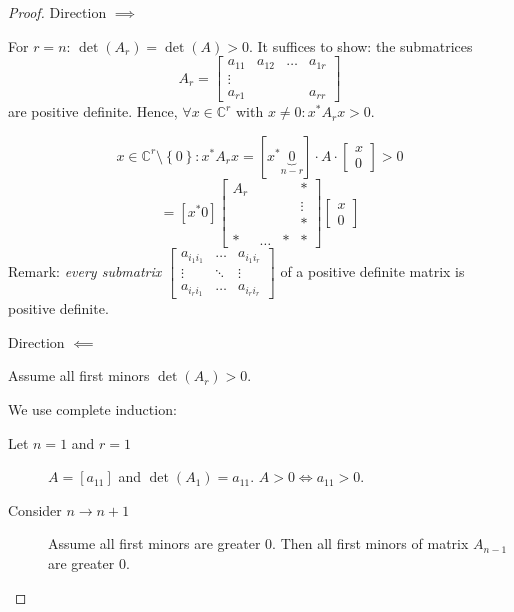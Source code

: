 \documentclass{article}
\newcommand{\set}[1]{\left\{#1\right\}}
\begin{document}
\begin{proof}
  Direction $\implies$

  For $r = n$: $\det(A_r) = \det(A) > 0$.
  It suffices to show: the submatrices
  \[ A_r = \begin{bmatrix} a_{11} & a_{12} & \ldots & a_{1r} \\ \vdots & & & \\ a_{r1} &  & & a_{rr} \end{bmatrix} \]
  are positive definite.
  Hence, $\forall x \in \mathbb C^r$ with $x \neq 0: x^* A_r x > 0$.

  \[ x \in \mathbb C^r \setminus \set{0}: x^* A_r x = \left[x^* \underbrace{0}_{n - r}\right] \cdot A \cdot \begin{bmatrix} x \\ 0 \end{bmatrix} > 0 \]
  \[ = [x^* 0] \begin{bmatrix} A_r & & & * \\ & & & \vdots \\ & & & * \\ * & \ldots & * & * \end{bmatrix} \begin{bmatrix} x \\ 0\end{bmatrix} \]
  Remark: \emph{every submatrix}
  $\begin{bmatrix} a_{i_1 i_1} & \ldots & a_{i_1 i_r} \\ \vdots & \ddots & \vdots \\ a_{i_r i_1} & \ldots & a_{i_r i_r} \end{bmatrix}$
  of a positive definite matrix is positive definite.

  Direction $\impliedby$

  Assume all first minors $\det(A_r) > 0$.

  We use complete induction:
  \begin{description}
    \item[Let $n=1$ and $r=1$]
      $A = [a_{11}]$ and $\det(A_1) = a_{11}$.
      $A > 0 \iff a_{11} > 0$.
    \item[Consider $n \to n+1$]
      Assume all first minors are greater 0.
      Then all first minors of matrix $A_{n-1}$ are greater 0.
  \end{description}
\end{proof}
\end{document}
